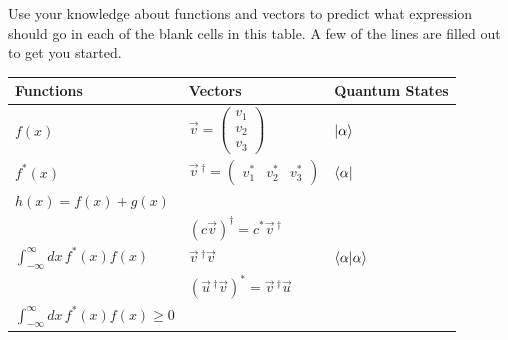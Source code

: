 	\begin{questions}
	
		\question Use your knowledge about functions and vectors to predict what expression should go in each of the blank cells in this table. A few of the lines are filled out to get you started.
		
			\begin{center}
				\renewcommand{\arraystretch}{1.5}
			\begin{tabular}{|C{2in}| C{2in} | C{2in}|}
				\hline
				
				\textbf{Functions} 
				& \textbf{Vectors}  
				& \textbf{Quantum States}
				\\
				\hline
				
				$f(x)$
				& $\vec v = \begin{pmatrix} v_1 \\ v_2 \\ v_3\end{pmatrix}$
				& $\ket{\alpha}$
				\\
				\hline
				
				$f^*(x)$
				& $\vec v\,^\dag = \begin{pmatrix} v_1^* & v_2^* & v_3^*\end{pmatrix}$
				& $\bra{\alpha}$
				\\
				\hline
				
				$h(x) = f(x) + g(x)$
				&
				& \vspace{0.75in}
				\\
				\hline
				
				& $\left( c\vec v \right)^\dag = c^* \vec v\,^\dag$
				& \vspace{0.75in}
				\\
				\hline
				
				$\int_{-\infty}^\infty dx\, f^*(x) f(x)$
				& $\vec v\,^\dag \vec v$
				& $\braket{\alpha|\alpha}$
				\\
				\hline
				
				&$\left(\vec u\,^\dag \vec v\right)^* = \vec v\,^\dag \vec u$
				& \vspace{0.75 in}
				\\
				\hline
				
				$\int_{-\infty}^\infty dx\, f^*(x) f(x) \geq 0$
				&
				& \vspace{0.75 in}
				\\
				\hline
				
				
			\end{tabular}
			\end{center}
		

\end{questions}
